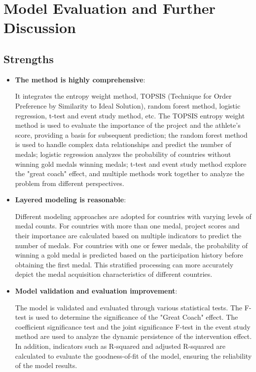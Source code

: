 \documentclass{mcmthesis}  %
\begin{document}
\section{Model Evaluation and Further Discussion}  %

\subsection{Strengths}  %

\begin{itemize}  %
\item \textbf{The method is highly comprehensive}: 

It integrates the entropy weight method, TOPSIS (Technique for Order Preference by Similarity to Ideal Solution), random forest method, logistic regression, t-test and event study method, etc. The TOPSIS entropy weight method is used to evaluate the importance of the project and the athlete's score, providing a basis for subsequent prediction; the random forest method is used to handle complex data relationships and predict the number of medals; logistic regression analyzes the probability of countries without winning gold medals winning medals; t-test and event study method explore the "great coach" effect, and multiple methods work together to analyze the problem from different perspectives.
\item \textbf{Layered modeling is reasonable}: 

Different modeling approaches are adopted for countries with varying levels of medal counts. For countries with more than one medal, project scores and their importance are calculated based on multiple indicators to predict the number of medals. For countries with one or fewer medals, the probability of winning a gold medal is predicted based on the participation history before obtaining the first medal. This stratified processing can more accurately depict the medal acquisition characteristics of different countries.
\item \textbf{Model validation and evaluation improvement}: 

The model is validated and evaluated through various statistical tests. The F-test is used to determine the significance of the "Great Coach" effect. The coefficient significance test and the joint significance F-test in the event study method are used to analyze the dynamic persistence of the intervention effect. In addition, indicators such as R-squared and adjusted R-squared are calculated to evaluate the goodness-of-fit of the model, ensuring the reliability of the model results.
\end{itemize}  %
\end{document}
